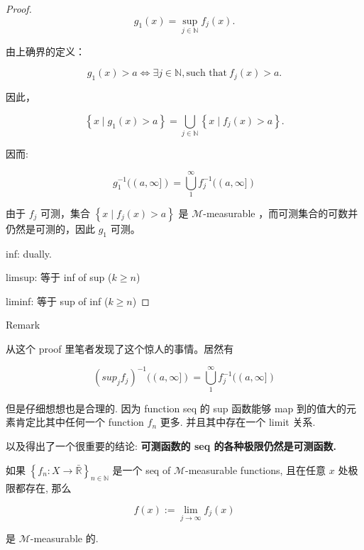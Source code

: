\documentclass{qlnotes-export}
\begin{document}
\begin{proof}

\[g_{1}(x) = \sup\limits_{j \in {\mathbb{N}}}f_{j}(x).\]

由上确界的定义：

\[g_{1}(x) > a\Leftrightarrow\exists j \in {\mathbb{N}},\text{such that}\ f_{j}(x) > a.\]

因此，

\[\left\{ {x \mid g_{1}(x) > a} \right\} = \bigcup\limits_{j \in {\mathbb{N}}}\left\{ {x \mid f_{j}(x) > a} \right\}.\]

因而:

\[g_{1}^{- 1}((a,\infty\rbrack) = \bigcup\limits_{1}^{\infty}f_{j}^{- 1}((a,\infty\rbrack)\]

由于 \(f_{j}\) 可测，集合 \(\left\{ {x \mid f_{j}(x) > a} \right\}\) 是 \(\mathcal{M}\)-measurable ，而可测集合的可数并仍然是可测的，因此 \(g_{1}\) 可测。

inf: dually.

limsup: 等于 inf of sup (\(k \geq n\))

liminf: 等于 sup of inf (\(k \geq n\))

\end{proof}

\begin{qlremark}{Remark}

从这个 proof 里笔者发现了这个惊人的事情。居然有

\[(sup_{j}f_{j})^{- 1}((a,\infty\rbrack) = \bigcup\limits_{1}^{\infty}f_{j}^{- 1}((a,\infty\rbrack)\]

但是仔细想想也是合理的. 因为 function seq 的 sup 函数能够 map 到的值大的元素肯定比其中任何一个 function \(f_{n}\) 更多. 并且其中存在一个 limit 关系.

以及得出了一个很重要的结论: \textbf{可测函数的 seq 的各种极限仍然是可测函数.}

\end{qlremark}

\begin{corollary}\label{cor-04-measurable-functions-and-integration-on-l-mu-corollary-001}

如果 \(\left\{ {f_{n}:X\rightarrow\bar{\mathbb{R}}} \right\}_{n \in {\mathbb{N}}}\) 是一个 seq of \(\mathcal{M}\)-measurable functions, 且在任意 \(x\) 处极限都存在, 那么

\[f(x) := \lim\limits_{j\rightarrow\infty}f_{j}(x)\]

是 \(\mathcal{M}\)-measurable 的.

\end{corollary}
\end{document}
